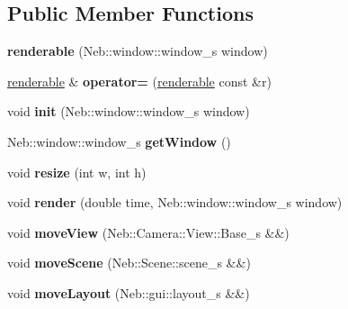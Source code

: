 \subsection*{\-Public \-Member \-Functions}
\begin{DoxyCompactItemize}
\item 
\hypertarget{classNeb_1_1renderable_af3b47768c919df0faf660899c33dd6e8}{{\bfseries renderable} (\-Neb\-::window\-::window\-\_\-s window)}\label{classNeb_1_1renderable_af3b47768c919df0faf660899c33dd6e8}

\item 
\hypertarget{classNeb_1_1renderable_a7c18c1b5d009a3fb73f86e335ffcc556}{\hyperlink{classNeb_1_1renderable}{renderable} \& {\bfseries operator=} (\hyperlink{classNeb_1_1renderable}{renderable} const \&r)}\label{classNeb_1_1renderable_a7c18c1b5d009a3fb73f86e335ffcc556}

\item 
\hypertarget{classNeb_1_1renderable_a7ff2af24b83fef9b240858976257ab3d}{void {\bfseries init} (\-Neb\-::window\-::window\-\_\-s window)}\label{classNeb_1_1renderable_a7ff2af24b83fef9b240858976257ab3d}

\item 
\hypertarget{classNeb_1_1renderable_a33656881f53f9be7bab71ea5cc316ef1}{\-Neb\-::window\-::window\-\_\-s {\bfseries get\-Window} ()}\label{classNeb_1_1renderable_a33656881f53f9be7bab71ea5cc316ef1}

\item 
\hypertarget{classNeb_1_1renderable_abd73b2bba233d1ff95fe46496888a5cf}{void {\bfseries resize} (int w, int h)}\label{classNeb_1_1renderable_abd73b2bba233d1ff95fe46496888a5cf}

\item 
\hypertarget{classNeb_1_1renderable_ab9c70cca0380015ecfde70d9a106c31c}{void {\bfseries render} (double time, \-Neb\-::window\-::window\-\_\-s window)}\label{classNeb_1_1renderable_ab9c70cca0380015ecfde70d9a106c31c}

\item 
\hypertarget{classNeb_1_1renderable_a58382d2c86f9d70e3315717d0b5d0cfd}{void {\bfseries move\-View} (\-Neb\-::\-Camera\-::\-View\-::\-Base\-\_\-s \&\&)}\label{classNeb_1_1renderable_a58382d2c86f9d70e3315717d0b5d0cfd}

\item 
\hypertarget{classNeb_1_1renderable_a22c9a9e313115bd24976d607d09b75e7}{void {\bfseries move\-Scene} (\-Neb\-::\-Scene\-::scene\-\_\-s \&\&)}\label{classNeb_1_1renderable_a22c9a9e313115bd24976d607d09b75e7}

\item 
\hypertarget{classNeb_1_1renderable_ac43c83e45f5f10eaf6b8ffc2c3a8a3ee}{void {\bfseries move\-Layout} (\-Neb\-::gui\-::layout\-\_\-s \&\&)}\label{classNeb_1_1renderable_ac43c83e45f5f10eaf6b8ffc2c3a8a3ee}

\end{DoxyCompactItemize}
